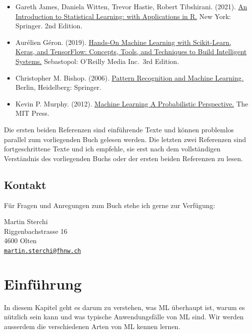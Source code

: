 \documentclass[
]{book}
\providecommand{\tightlist}{%
  \setlength{\itemsep}{0pt}\setlength{\parskip}{0pt}}
\begin{document}
\begin{itemize}
\tightlist
\item
  Gareth James, Daniela Witten, Trevor Hastie, Robert Tibshirani. (2021). \href{https://www.statlearning.com/}{An Introduction to Statistical Learning: with Applications in R.} New York: Springer. 2nd Edition.
\item
  Aurélien Géron. (2019). \href{https://www.oreilly.com/library/view/hands-on-machine-learning/9781098125967/}{Hands-On Machine Learning with Scikit-Learn, Keras, and TensorFlow: Concepts, Tools, and Techniques to Build Intelligent Systems.} Sebastopol: O'Reilly Media Inc.~3rd Edition.
\item
  Christopher M. Bishop. (2006). \href{https://link.springer.com/book/9780387310732}{Pattern Recognition and Machine Learning.} Berlin, Heidelberg: Springer.
\item
  Kevin P. Murphy. (2012). \href{https://mitpress.mit.edu/9780262018029/machine-learning/}{Machine Learning A Probabilistic Perspective.} The MIT Press.
\end{itemize}

Die ersten beiden Referenzen sind einführende Texte und können problemlos parallel zum vorliegenden Buch gelesen werden. Die letzten zwei Referenzen sind fortgeschrittene Texte und ich empfehle, sie erst nach dem vollständigen Verständnis des vorliegenden Buchs oder der ersten beiden Referenzen zu lesen.

\hypertarget{kontakt}{%
\section*{Kontakt}\label{kontakt}}

Für Fragen und Anregungen zum Buch stehe ich gerne zur Verfügung:

Martin Sterchi\\
Riggenbachstrasse 16\\
4600 Olten\\
\href{mailto:martin.sterchi@fhnw.ch}{\nolinkurl{martin.sterchi@fhnw.ch}}

\hypertarget{intro}{%
\chapter{Einführung}\label{intro}}

In diesem Kapitel geht es darum zu verstehen, was ML überhaupt ist, warum es nützlich sein kann und was typische Anwendungsfälle von ML sind. Wir werden ausserdem die verschiedenen Arten von ML kennen lernen.
\end{document}
